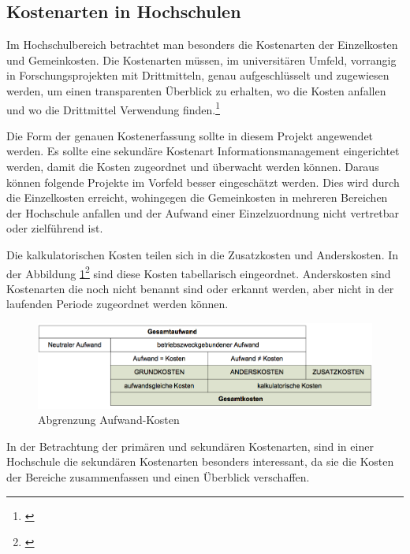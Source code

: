 
\clearpage

\subsection{Kostenarten in Hochschulen}
Im Hochschulbereich betrachtet man besonders die Kostenarten der Einzelkosten und Gemeinkosten. Die Kostenarten müssen, im universitären Umfeld, vorrangig in Forschungsprojekten mit Drittmitteln, genau aufgeschlüsselt und zugewiesen werden, um einen transparenten Überblick zu erhalten, wo die Kosten anfallen und wo die Drittmittel Verwendung finden.\footnote{\autocite[7]{pkl_2005}}

Die Form der genauen Kostenerfassung sollte in diesem Projekt angewendet werden. Es sollte eine sekundäre Kostenart Informationsmanagement eingerichtet werden, damit die Kosten zugeordnet und überwacht werden können. Daraus können folgende Projekte im Vorfeld besser eingeschätzt werden. Dies wird durch die Einzelkosten erreicht, wohingegen die Gemeinkosten in mehreren Bereichen der Hochschule anfallen und der Aufwand einer Einzelzuordnung nicht vertretbar oder zielführend ist.

Die kalkulatorischen Kosten teilen sich in die Zusatzkosten und Anderskosten. In der Abbildung \ref{fig_abgrenzung_aufwand}\footnote{\autocite[9-10]{pkl_2005}} sind diese Kosten tabellarisch eingeordnet. Anderskosten sind Kostenarten die noch nicht benannt sind oder erkannt werden, aber nicht in der laufenden Periode zugeordnet werden können. 

\begin{figure}[h!]
	\centering
	\includegraphics[width=\textwidth]
	{kapitel/gruppe4_2/bilder/abgrenzung_aufwand}
	\caption{Abgrenzung Aufwand-Kosten}
	\label{fig_abgrenzung_aufwand}
\end{figure}

In der Betrachtung der primären und sekundären Kostenarten, sind in einer Hochschule die sekundären Kostenarten besonders interessant, da sie die Kosten der Bereiche zusammenfassen und einen Überblick verschaffen.

